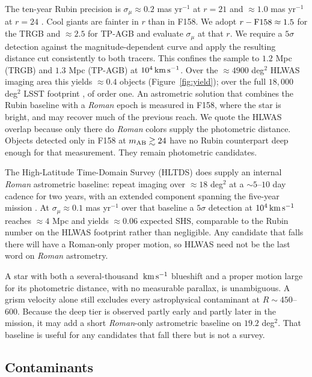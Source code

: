 \documentclass[twocolumn]{aastex701}
\newcommand{\kms}{\,{\rm km\,s^{-1}}}
\begin{document}
The ten-year Rubin precision is $\sigma_{\mu}\approx0.2$ mas yr$^{-1}$ at
$r=21$ and $\approx1.0$ mas yr$^{-1}$ at $r=24$ \citep[][their
Table~2]{ivezic08}. Cool giants are fainter in $r$ than in F158. We adopt
$r-{\rm F158}\approx1.5$ for the TRGB and $\approx2.5$ for TP-AGB and
evaluate $\sigma_{\mu}$ at that $r$. We require a $5\sigma$ detection against
the magnitude-dependent curve and apply the resulting distance cut
consistently to both tracers. This confines the sample to $1.2$ Mpc (TRGB) and
$1.3$ Mpc (TP-AGB) at $10^{4}\kms$. Over the $\approx4900$ deg$^{2}$ HLWAS
imaging area this yields $\approx0.4$ objects (Figure~\ref{fig:yield}); over
the full $18{,}000$ deg$^{2}$ LSST footprint \citep{ivezic19}, of order one.
An astrometric solution that combines the Rubin baseline with a
\textit{Roman} epoch is measured in F158, where the star is bright, and may recover much of the previous reach. We quote the
HLWAS overlap because only there do \textit{Roman} colors supply the
photometric distance. Objects detected only in F158 at
$m_{\rm AB}\gtrsim24$ have no Rubin counterpart deep enough for that
measurement. They remain photometric candidates.

The High-Latitude Time-Domain Survey (HLTDS) does supply an internal
\textit{Roman} astrometric baseline: repeat imaging over $\approx18$ deg$^{2}$
at a $\sim5$--$10$ day cadence for two years, with an extended component
spanning the five-year mission . At
$\sigma_{\mu}\approx0.1$ mas yr$^{-1}$ over that baseline a $5\sigma$
detection at $10^{4}\kms$ reaches $\approx4$ Mpc and yields $\approx0.06$
expected SHS, comparable to the Rubin number on the HLWAS footprint rather
than negligible. Any candidate that falls there will have a Roman-only
proper motion, so HLWAS need not be the last
word on \textit{Roman} astrometry.

A star with both a several-thousand $\kms$ blueshift and a proper motion
large for its photometric distance, with no measurable parallax, is
unambiguous. A grism velocity alone still excludes every astrophysical
contaminant at $R\sim450$--$600$. Because the deep tier is observed partly
early and partly later in the mission, it may add a short \textit{Roman}-only
astrometric baseline on $19.2$ deg$^{2}$. That baseline is useful for any
candidates that fall there but is not a survey.

\subsection{Contaminants}
\end{document}
